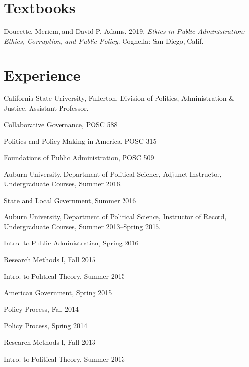 \documentclass[11pt,letterpaper]{article}
\renewenvironment{itemize}{
  \begin{list}{}{
    \setlength{\leftmargin}{1.5em}
    \setlength{\itemsep}{0.25em}
    \setlength{\parskip}{0pt}
    \setlength{\parsep}{0.25em}
  }
}{
  \end{list}
}
\begin{document}
\section*{Textbooks}
	\begin{itemize}
		\item Doucette, Meriem, and David P. Adams. 2019. \emph{Ethics in Public Administration: Ethics, Corruption, and Public Policy}. Cognella: San Diego, Calif. 
	\end{itemize}
		
\section*{Experience}

\begin{itemize}\leftmargin=2pt\itemindent=-15pt
	
\item California State University, Fullerton, Division of Politics, Administration \& Justice, Assistant Professor.
	\begin{itemize}
		\item Collaborative Governance, POSC 588
		\item Politics and Policy Making in America, POSC 315
		\item Foundations of Public Administration, POSC 509
	\end{itemize}
	
\item Auburn University, Department of Political Science, Adjunct Instructor, Undergraduate Courses, Summer 2016.
	\begin{itemize}\leftmargin=2pt\itemindent=-15pt
		\item State and Local Government, Summer 2016
	\end{itemize}
	
\item Auburn University, Department of Political Science, Instructor of Record, Undergraduate Courses, Summer 2013--Spring 2016.
  	\begin{itemize}\leftmargin=2pt\itemindent=-15pt
			\begin{multicols}{2}
			\item Intro. to Public Administration, Spring 2016
			\item Research Methods I, Fall 2015      
			\item Intro. to Political Theory, Summer 2015
			\item American Government, Spring 2015
			\item Policy Process, Fall 2014	
			\item Policy Process, Spring 2014
			\item Research Methods I, Fall 2013
			\item Intro. to Political Theory, Summer 2013
		 	\end{multicols}				
	\end{itemize}


\end{itemize}
\end{document}
